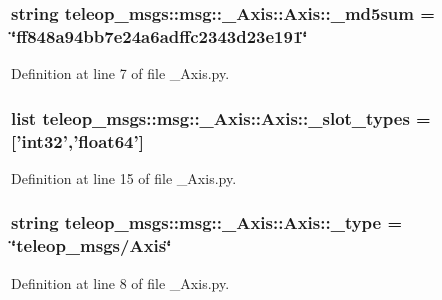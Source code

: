 \subsubsection[{\_\-md5sum}]{\setlength{\rightskip}{0pt plus 5cm}string {\bf teleop\_\-msgs::msg::\_\-Axis::Axis::\_\-md5sum} = \char`\"{}ff848a94bb7e24a6adffc2343d23e191\char`\"{}\hspace{0.3cm}{\ttfamily  [static, private]}}\label{classteleop__msgs_1_1msg_1_1__Axis_1_1Axis_a5e165a0b094e5f9567f22b468fac7ed0}


Definition at line 7 of file \_\-Axis.py.

\subsubsection[{\_\-slot\_\-types}]{\setlength{\rightskip}{0pt plus 5cm}list {\bf teleop\_\-msgs::msg::\_\-Axis::Axis::\_\-slot\_\-types} = ['int32','float64']\hspace{0.3cm}{\ttfamily  [static, private]}}\label{classteleop__msgs_1_1msg_1_1__Axis_1_1Axis_a1a6f67dc52ca8d825ddb89109c172d31}


Definition at line 15 of file \_\-Axis.py.

\subsubsection[{\_\-type}]{\setlength{\rightskip}{0pt plus 5cm}string {\bf teleop\_\-msgs::msg::\_\-Axis::Axis::\_\-type} = \char`\"{}teleop\_\-msgs/{\bf Axis}\char`\"{}\hspace{0.3cm}{\ttfamily  [static, private]}}\label{classteleop__msgs_1_1msg_1_1__Axis_1_1Axis_ab85a2a2bc98ea9117e1b71622d07a393}


Definition at line 8 of file \_\-Axis.py.

\subsubsection[{type}]{}\label{classteleop__msgs_1_1msg_1_1__Axis_1_1Axis_a6d173d0bd12e7777ab437b4c1a491697}


